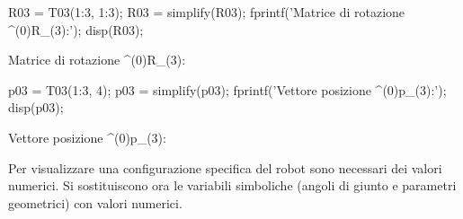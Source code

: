\documentclass[11pt, a4paper]{article}
\begin{document}
\begin{matlabcode}
R03 = T03(1:3, 1:3);
R03 = simplify(R03);
fprintf('Matrice di rotazione ^(0)R_(3):\n');
disp(R03);
\end{matlabcode}
\begin{matlaboutput}
Matrice di rotazione ^(0)R_(3):
\end{matlaboutput}
\begin{matlabcode}

p03 = T03(1:3, 4);
p03 = simplify(p03);
fprintf('Vettore posizione ^(0)p_(3):\n');
disp(p03);
\end{matlabcode}
\begin{matlaboutput}
Vettore posizione ^(0)p_(3):
\end{matlaboutput}

\begin{par}
\begin{flushleft}
Per visualizzare una configurazione specifica del robot sono necessari dei valori numerici. Si sostituiscono ora le variabili simboliche (angoli di giunto e parametri geometrici) con valori numerici.
\end{flushleft}
\end{par}
\end{document}
